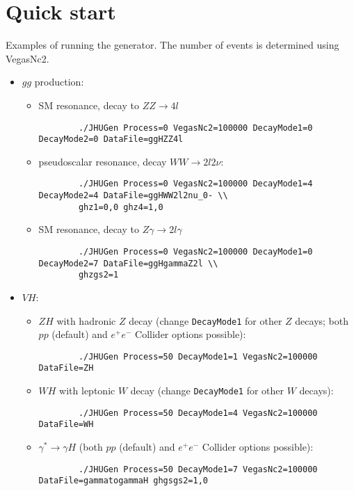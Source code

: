 \documentclass[aps,superscriptaddress,nofootinbib]{revtex4}
\begin{document}
\section{Quick start}

Examples of running the generator.  The number of events is determined using VegasNc2.
\begin{itemize}
	\item $gg$ production:
	\begin{itemize}
		\item SM resonance, decay to $ZZ\to 4l$
		\begin{verbatim}
		./JHUGen Process=0 VegasNc2=100000 DecayMode1=0 DecayMode2=0 DataFile=ggHZZ4l
		\end{verbatim}
		\item pseudoscalar resonance, decay $WW\to 2l2\nu$:
		\begin{verbatim}
		./JHUGen Process=0 VegasNc2=100000 DecayMode1=4 DecayMode2=4 DataFile=ggHWW2l2nu_0- \\
		ghz1=0,0 ghz4=1,0
		\end{verbatim}
		\item SM resonance, decay to $Z\gamma\to 2l\gamma$
		\begin{verbatim}
		./JHUGen Process=0 VegasNc2=100000 DecayMode1=0 DecayMode2=7 DataFile=ggHgammaZ2l \\
		ghzgs2=1
		\end{verbatim}
	\end{itemize}
	\item $VH$:
	\begin{itemize}
		\item $ZH$ with hadronic $Z$ decay (change \verb|DecayMode1| for other $Z$ decays; both $pp$ (default) and $e^+e^-$ Collider options possible):
		\begin{verbatim}
		./JHUGen Process=50 DecayMode1=1 VegasNc2=100000 DataFile=ZH
		\end{verbatim}
		\item $WH$ with leptonic $W$ decay (change \verb|DecayMode1| for other $W$ decays):
		\begin{verbatim}
		./JHUGen Process=50 DecayMode1=4 VegasNc2=100000 DataFile=WH
		\end{verbatim}
		\item $\gamma^*\to\gamma H$ (both $pp$ (default) and $e^+e^-$ Collider options possible):
		\begin{verbatim}
		./JHUGen Process=50 DecayMode1=7 VegasNc2=100000 DataFile=gammatogammaH ghgsgs2=1,0
		\end{verbatim}

\end{itemize}
\end{itemize}
\end{document}
